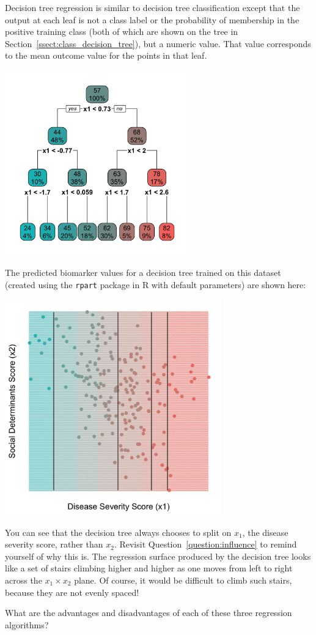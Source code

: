 Decision tree regression is similar to decision tree classification except that the output at each leaf is not a class label or the probability of membership in the positive training class (both of which are shown on the tree in Section~\ref{ssect:class_decision_tree}), but a numeric value. That value corresponds to the mean outcome value for the points in that leaf. 
\begin{center}
\includegraphics[width=0.6\textwidth]{img/esl-decision-tree-just-tree-reg.png}
\end{center}
The predicted biomarker values for a decision tree trained on this dataset (created using the \texttt{rpart} package in R with default parameters) are shown here:
\begin{center}
\includegraphics[width=0.7\textwidth]{img/esl-reg-decision-tree.png}
\end{center}
You can see that the decision tree always chooses to split on $x_1$, the disease severity score, rather than $x_2$. Revisit Question~\ref{question:influence} to remind yourself of why this is. The regression surface produced by the decision tree looks like a set of stairs climbing higher and higher as one moves from left to right across the $x_1 \times x_2$ plane. Of course, it would be difficult to climb such stairs, because they are not evenly spaced!
\vspace{5mm}

\begin{question}{}
What are the advantages and disadvantages of each of these three regression algorithms?
\end{question}

